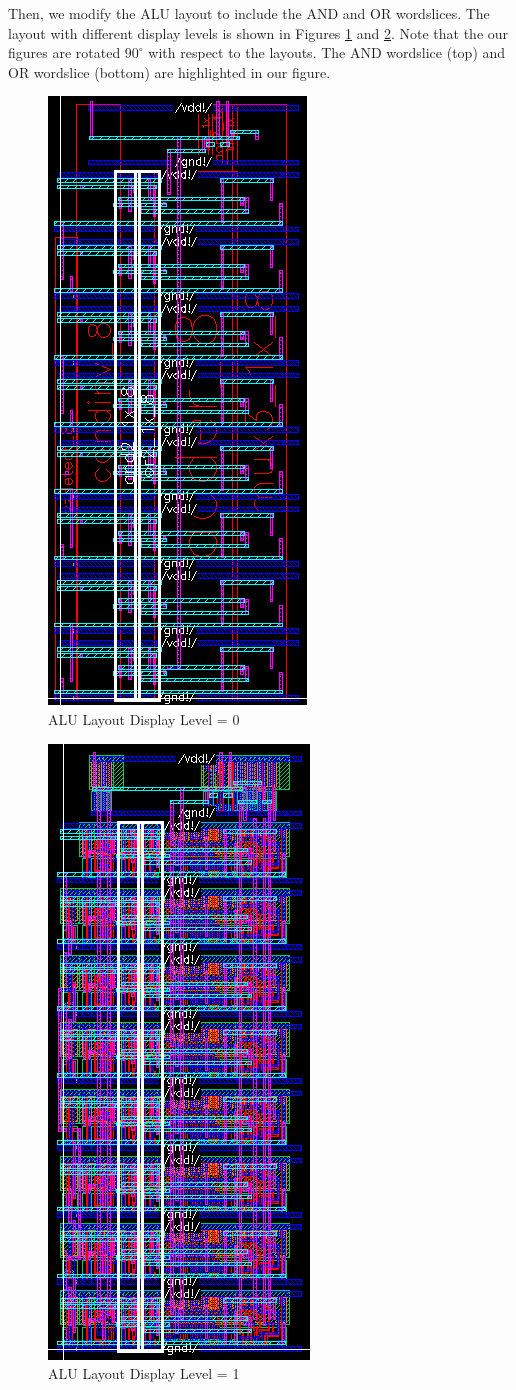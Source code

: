 \documentclass{article}
\begin{document}
	\noindent Then, we modify the ALU layout to include the AND and OR wordslices. The layout with different display levels is shown in Figures \ref{fig::alu_layout_overview} and \ref{fig::alu_layout_detailed}. Note that the our figures are rotated $90^{\circ}$ with respect to the layouts. The AND wordslice (top) and OR wordslice (bottom) are highlighted in our figure.
	
	\begin{figure}[H]
		\centerline{\includegraphics[height=0.8\textwidth, angle=270]{alu_layout_overview.png}}
		\caption{ALU Layout Display Level = 0}
		\label{fig::alu_layout_overview}
	\end{figure}
	
	\begin{figure}[H]
		\centerline{\includegraphics[height=0.8\textwidth, angle=270]{alu_layout_detailed.png}}
		\caption{ALU Layout Display Level = 1}
		\label{fig::alu_layout_detailed}
	\end{figure}
	
\end{document}
